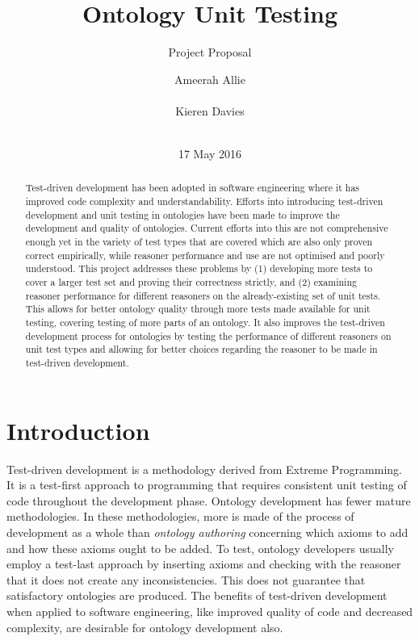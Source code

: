 \documentclass[draft]{sig-alternate}
\begin{document}
\title{Ontology Unit Testing}
\subtitle{Project Proposal}
\author{
  \alignauthor
  Ameerah Allie\\
    \\
  \alignauthor
  Kieren Davies\\
   \\
}
\date{17 May 2016}
\maketitle

\begin{abstract}
  Test-driven development has been adopted in software engineering where it has improved code complexity and understandability. Efforts into introducing test-driven development and unit testing in ontologies have been made to improve the development and quality of ontologies. Current efforts into this are not comprehensive enough yet in the variety of test types that are covered which are also only proven correct empirically, while reasoner performance and use are not optimised and poorly understood. This project addresses these problems by (1) developing more tests to cover a larger test set and proving their correctness strictly, and (2) examining reasoner performance for different reasoners on the already-existing set of unit tests. This allows for better ontology quality through more tests made available for unit testing, covering testing of more parts of an ontology. It also improves the test-driven development process for ontologies by testing the performance of different reasoners on unit test types and allowing for better choices regarding the reasoner to be made in test-driven development.
\end{abstract}

\section{Introduction}

Test-driven development is a methodology derived from Extreme Programming. It is a test-first approach to programming that requires consistent unit testing of code throughout the development phase. Ontology development has fewer mature methodologies. In these methodologies, more is made of the process of development as a whole than \textit{ontology authoring} concerning which axioms to add and how these axioms ought to be added. To test, ontology developers usually employ a test-last approach by inserting axioms and checking with the reasoner that it does not create any inconsistencies. This does not guarantee that satisfactory ontologies are produced. The benefits of test-driven development when applied to software engineering, like improved quality of code and decreased complexity, are desirable for ontology development also.
\end{document}
